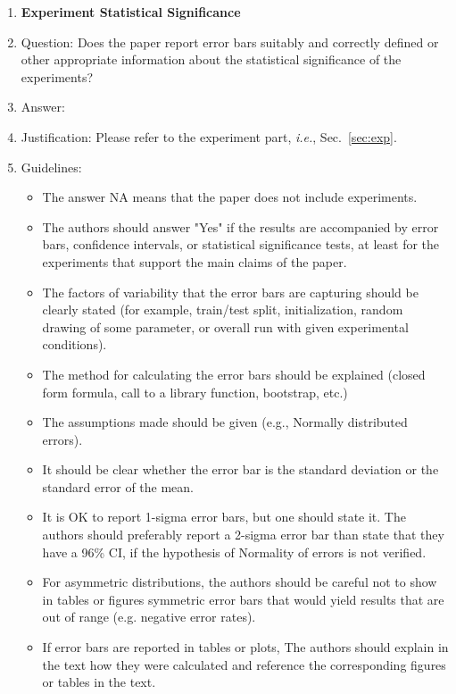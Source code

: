 \documentclass{article}
\begin{document}
\begin{enumerate}
\item {\bf Experiment Statistical Significance}
    \item[] Question: Does the paper report error bars suitably and correctly defined or other appropriate information about the statistical significance of the experiments?
    \item[] Answer: \answerYes{} %
    \item[] Justification: Please refer to the experiment part, \emph{i.e.}, Sec.~\ref{sec:exp}.
    \item[] Guidelines:
    \begin{itemize}
        \item The answer NA means that the paper does not include experiments.
        \item The authors should answer "Yes" if the results are accompanied by error bars, confidence intervals, or statistical significance tests, at least for the experiments that support the main claims of the paper.
        \item The factors of variability that the error bars are capturing should be clearly stated (for example, train/test split, initialization, random drawing of some parameter, or overall run with given experimental conditions).
        \item The method for calculating the error bars should be explained (closed form formula, call to a library function, bootstrap, etc.)
        \item The assumptions made should be given (e.g., Normally distributed errors).
        \item It should be clear whether the error bar is the standard deviation or the standard error of the mean.
        \item It is OK to report 1-sigma error bars, but one should state it. The authors should preferably report a 2-sigma error bar than state that they have a 96\% CI, if the hypothesis of Normality of errors is not verified.
        \item For asymmetric distributions, the authors should be careful not to show in tables or figures symmetric error bars that would yield results that are out of range (e.g. negative error rates).
        \item If error bars are reported in tables or plots, The authors should explain in the text how they were calculated and reference the corresponding figures or tables in the text.
    \end{itemize}


\end{enumerate}
\end{document}
